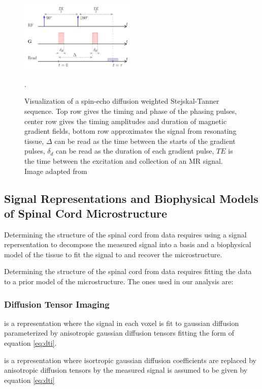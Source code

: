 \begin{figure}
    \includegraphics[width=0.5\textwidth]{figures/sequence.png}
    \caption{Visualization of a spin-echo diffusion weighted Stejskal-Tanner sequence. Top row gives the timing and phase of the \dmri phasing pulses, center row gives the timing amplitudes and duration of magnetic gradient fields, bottom row approximates the signal from resonating tissue, $\Delta$ can be read as the time between the starts of the gradient pulses, $\delta_d$ can be read as the duration of each gradient pulse, $TE$ is the time between the excitation and collection of an MR signal. Image adapted from \cite{rohmer2006bloch}}.
    \label{fig:sequence}
\end{figure}

\subsection{Signal Representations and Biophysical Models of Spinal Cord Microstructure}
Determining the structure of the spinal cord from \dmri data requires using a signal repersentation to decompose the measured signal into a basis and a biophysical model of the tissue to fit the signal to and recover the microstructure.

Determining the structure of the spinal cord from \dmri data requires fitting the data to a prior model of the microstructure. The ones used in our analysis are:
\fi

\subsubsection{Diffusion Tensor Imaging}
\dti is a representation where the signal in each voxel is fit to gaussian diffusion parameterized by anisotropic gaussian diffusion tensors fitting the form of equation \ref{eq:dti}.

\dti is a representation where isortropic gaussian diffusion coefficients are replaced by anisotropic diffusion tensors by the measured signal is assumed to be given by equation \ref{eq:dti}
\fi

